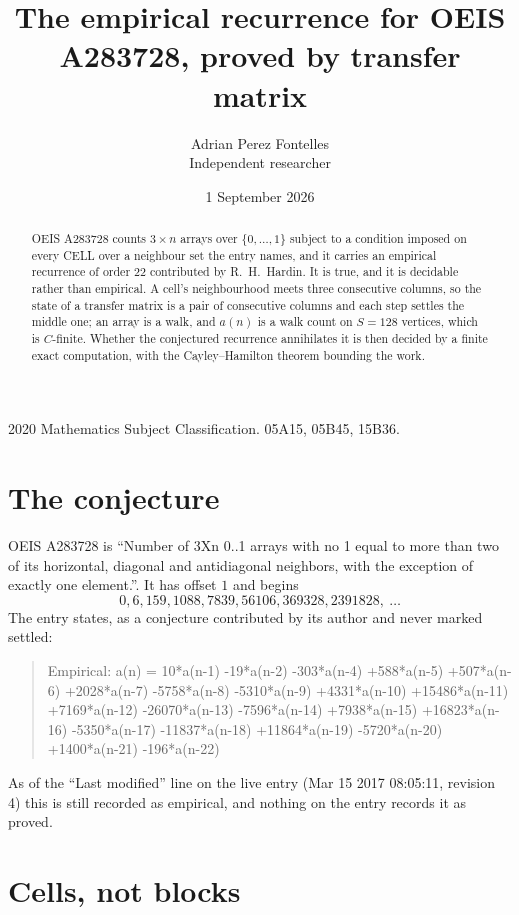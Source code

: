 \documentclass[11pt,a4paper]{article}
\title{The empirical recurrence for OEIS A283728, proved by transfer matrix}
\author{Adrian Perez Fontelles\\ \small Independent researcher}
\date{1 September 2026}
\theoremstyle{plain}
\theoremstyle{definition}
\begin{document}
\maketitle

\begin{abstract}
OEIS A283728 counts $3\times n$ arrays over $\{0,\dots,1\}$ subject to a condition imposed on
every CELL over a neighbour set the entry names, and it carries an empirical recurrence of
order $22$ contributed by R.~H.~Hardin. It is true, and it is decidable rather than
empirical. A cell's neighbourhood meets three consecutive columns, so the state of a transfer
matrix is a pair of consecutive columns and each step settles the middle one; an array is a
walk, and $a(n)$ is a walk count on $S=128$ vertices, which is $C$-finite. Whether the
conjectured recurrence annihilates it is then decided by a finite exact computation, with the
Cayley--Hamilton theorem bounding the work.
\end{abstract}

\noindent\small 2020 Mathematics Subject Classification. 05A15, 05B45, 15B36.\normalsize

\section{The conjecture}

OEIS A283728 is ``Number of 3Xn 0..1 arrays with no 1 equal to more than two of its horizontal, diagonal and antidiagonal neighbors, with the exception of exactly one element.''. It has offset $1$ and begins
\[
0, 6, 159, 1088, 7839, 56106, 369328, 2391828,\ \dots
\]
The entry states, as a conjecture contributed by its author and never marked settled:
\begin{quote}
Empirical: a(n) = 10*a(n-1) -19*a(n-2) -303*a(n-4) +588*a(n-5) +507*a(n-6) +2028*a(n-7) -5758*a(n-8) -5310*a(n-9) +4331*a(n-10) +15486*a(n-11) +7169*a(n-12) -26070*a(n-13) -7596*a(n-14) +7938*a(n-15) +16823*a(n-16) -5350*a(n-17) -11837*a(n-18) +11864*a(n-19) -5720*a(n-20) +1400*a(n-21) -196*a(n-22)
\end{quote}
As of the ``Last modified'' line on the live entry (Mar 15 2017 08:05:11, revision 4) this is still
recorded as empirical, and nothing on the entry records it as proved.

\section{Cells, not blocks}
\end{document}
